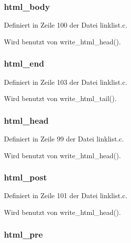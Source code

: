 \subsubsection{ {\bf html\_\-body}}\label{linklist_8h_4bb0bd1db8f0b3cc89d509d8c5daddde}




Definiert in Zeile 100 der Datei linklist.c.

Wird benutzt von write\_\-html\_\-head().
\subsubsection{ {\bf html\_\-end}}\label{linklist_8h_d7f0906501b524d986d95f8efddb48e5}




Definiert in Zeile 103 der Datei linklist.c.

Wird benutzt von write\_\-html\_\-tail().
\subsubsection{ {\bf html\_\-head}}\label{linklist_8h_1811e9595e278ef4ac307d06cd3a4eed}




Definiert in Zeile 99 der Datei linklist.c.

Wird benutzt von write\_\-html\_\-head().
\subsubsection{ {\bf html\_\-post}}\label{linklist_8h_fd6de839e46d75632279853537235e7c}




Definiert in Zeile 101 der Datei linklist.c.

Wird benutzt von write\_\-html\_\-head().
\subsubsection{ {\bf html\_\-pre}}\label{linklist_8h_cea32428cfbcce0e252dd3613586d0f3}




